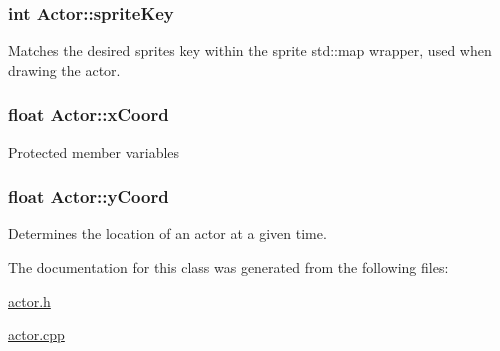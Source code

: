 \subsubsection[{\texorpdfstring{sprite\+Key}{spriteKey}}]{\setlength{\rightskip}{0pt plus 5cm}int Actor\+::sprite\+Key\hspace{0.3cm}{\ttfamily [protected]}}\hypertarget{class_actor_a87edc76c25d94d8d8c3a09712d554c12}{}\label{class_actor_a87edc76c25d94d8d8c3a09712d554c12}
Matches the desired sprite\textquotesingle{}s key within the sprite std\+::map wrapper, used when drawing the actor. 
\subsubsection[{\texorpdfstring{x\+Coord}{xCoord}}]{\setlength{\rightskip}{0pt plus 5cm}float Actor\+::x\+Coord\hspace{0.3cm}{\ttfamily [protected]}}\hypertarget{class_actor_a4877e499ea069ddbab1ba119388e09ae}{}\label{class_actor_a4877e499ea069ddbab1ba119388e09ae}
Protected member variables 
\subsubsection[{\texorpdfstring{y\+Coord}{yCoord}}]{\setlength{\rightskip}{0pt plus 5cm}float Actor\+::y\+Coord\hspace{0.3cm}{\ttfamily [protected]}}\hypertarget{class_actor_aecada08b60c88c78e2e28b4af48c4baf}{}\label{class_actor_aecada08b60c88c78e2e28b4af48c4baf}
Determines the location of an actor at a given time. 

The documentation for this class was generated from the following files\+:\begin{DoxyCompactItemize}
\item 
\hyperlink{actor_8h}{actor.\+h}\item 
\hyperlink{actor_8cpp}{actor.\+cpp}\end{DoxyCompactItemize}

